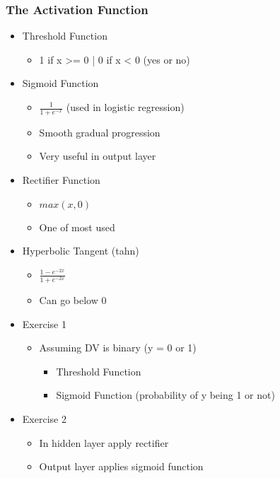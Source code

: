 \documentclass[11pt]{article}
\begin{document}
\subsubsection{The Activation Function}
\label{sec:org2bb2fcd}

\begin{itemize}
\item Threshold Function
\begin{itemize}
\item 1 if x >= 0 | 0 if x < 0 (yes or no)
\end{itemize}
\item Sigmoid Function
\begin{itemize}
\item \(\frac{1}{1 + e^{-x}}\) (used in logistic regression)
\item Smooth gradual progression
\item Very useful in output layer
\end{itemize}
\item Rectifier Function
\begin{itemize}
\item \(max(x,0)\)
\item One of most used
\end{itemize}
\item Hyperbolic Tangent (tahn)
\begin{itemize}
\item \(\frac{1 - e^{-2x}}{ 1 + e^{-2x}}\)
\item Can go below 0
\end{itemize}

\item Exercise 1
\begin{itemize}
\item Assuming DV is binary (y = 0 or 1)
\begin{itemize}
\item Threshold Function
\item Sigmoid Function (probability of y being 1 or not)
\end{itemize}
\end{itemize}
\item Exercise 2
\begin{itemize}
\item In hidden layer apply rectifier
\item Output layer applies sigmoid function
\end{itemize}
\end{itemize}
\end{document}
